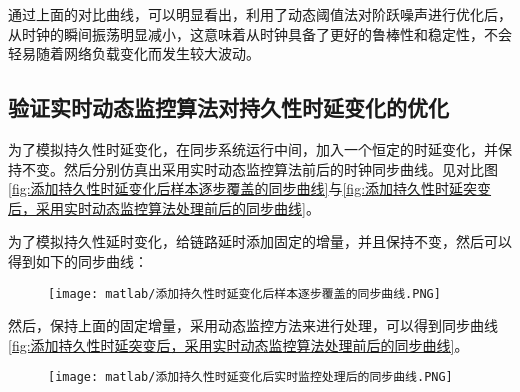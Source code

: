 通过上面的对比曲线，可以明显看出，利用了动态阈值法对阶跃噪声进行优化后，从时钟的瞬间振荡明显减小，这意味着从时钟具备了更好的鲁棒性和稳定性，不会轻易随着网络负载变化而发生较大波动。

\subsection{验证实时动态监控算法对持久性时延变化的优化}
为了模拟持久性时延变化，在同步系统运行中间，加入一个恒定的时延变化，并保持不变。然后分别仿真出采用实时动态监控算法前后的时钟同步曲线。见对比图\ref{fig:添加持久性时延变化后样本逐步覆盖的同步曲线}与\ref{fig:添加持久性时延突变后，采用实时动态监控算法处理前后的同步曲线}。

为了模拟持久性延时变化，给链路延时添加固定的增量，并且保持不变，然后可以得到如下的同步曲线：

\begin{figure}[!hbp]
  \centering
  \begin{minipage}[b]{1\textwidth}
    \captionstyle{\centering}
    \centering
    \texttt{[image: matlab/添加持久性时延变化后样本逐步覆盖的同步曲线.PNG]}
  \end{minipage}     
\end{figure}

然后，保持上面的固定增量，采用动态监控方法来进行处理，可以得到同步曲线\ref{fig:添加持久性时延突变后，采用实时动态监控算法处理前后的同步曲线}。

\begin{figure}[htbp]
  \centering
  \begin{minipage}[b]{1\textwidth}
    \captionstyle{\centering}
    \centering
    \texttt{[image: matlab/添加持久性时延变化后实时监控处理后的同步曲线.PNG]}
  \end{minipage}     
\end{figure}

